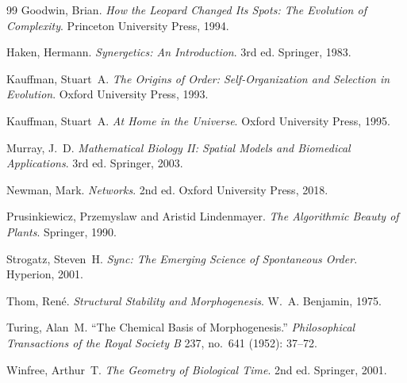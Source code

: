 \documentclass[12pt, a4paper, openany]{book}
\theoremstyle{definition}
\theoremstyle{remark}
\begin{document}
\begin{thebibliography}{99}
Goodwin, Brian.
\textit{How the Leopard Changed Its Spots: The Evolution of Complexity}.
Princeton University Press, 1994.

Haken, Hermann.
\textit{Synergetics: An Introduction}.
3rd ed.
Springer, 1983.

Kauffman, Stuart~A.
\textit{The Origins of Order: Self-Organization and Selection in Evolution}.
Oxford University Press, 1993.

Kauffman, Stuart~A.
\textit{At Home in the Universe}.
Oxford University Press, 1995.

Murray, J.~D.
\textit{Mathematical Biology II: Spatial Models and Biomedical Applications}.
3rd ed.
Springer, 2003.

Newman, Mark.
\textit{Networks}.
2nd ed.
Oxford University Press, 2018.

Prusinkiewicz, Przemyslaw and Aristid Lindenmayer.
\textit{The Algorithmic Beauty of Plants}.
Springer, 1990.

Strogatz, Steven~H.
\textit{Sync: The Emerging Science of Spontaneous Order}.
Hyperion, 2001.

Thom, Ren\'{e}.
\textit{Structural Stability and Morphogenesis}.
W.~A. Benjamin, 1975.

Turing, Alan~M.
``The Chemical Basis of Morphogenesis.''
\textit{Philosophical Transactions of the Royal Society B}
237, no.~641 (1952): 37--72.

Winfree, Arthur~T.
\textit{The Geometry of Biological Time}.
2nd ed.
Springer, 2001.

\end{thebibliography}
\end{document}

